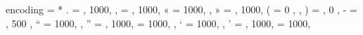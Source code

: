 \hypersetup{
  colorlinks=true,
  allcolors=blue
}

\onehalfspacing   %

\setlength{\droptitle}{-2em}


\SetProtrusion
{ encoding = *}
{
  {.} = {    , 1000},
  {,} = {    , 1000},
  {«} = {1000,     },
  {»} = {    , 1000},
  {(} = { 0  ,     },
  {)} = {    , 0   },
  {-} = {    , 500 },
  \textquotedblleft
      = {1000,     },
  \textquotedblright
      = {    , 1000},
  \quotedblbase
      = {1000,     },
  \textquoteleft
      = {1000,     },
  \textquoteright
      = {    , 1000},
  \quotesinglbase
      = {1000,     }
}


